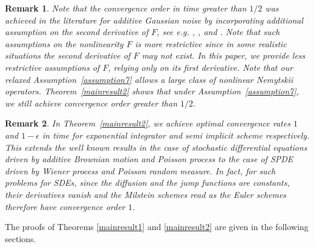\documentclass[review,12pt]{elsarticle}
\newtheorem{remark}{Remark}[section]
\newcommand{\thmref}[1]{{Theorem~\ref{#1}}}
\newcommand{\assref}[1]{{Assumption~\ref{#1}}}
\begin{document}
\begin{remark}
\label{remarkconditions}
Note that the convergence order in time greater than $1/2$ was achieved in the literature for additive Gaussian noise by incorporating additional assumption on the second derivative of $F$, see e.g. \cite[Assumption 2.2]{Xiaojie2}, \cite[Assumption 2.1]{Xiaojie3}, \cite[Assumption 2.2]{AntonioRev1} and \cite[Assumption 2.1]{AntonioRev2}. Note that such assumptions on the nonlinearity $F$ is more restrictive since in some realistic situations the second derivative of $F$ may not exist. In this paper, we provide less restrictive assumptions of $F$, relying only on  its first derivative. Note that our relaxed \assref{assumption7} allows a large class of nonlinear Nemytskii operators. \thmref{mainresult2} shows that under \assref{assumption7}, we still achieve convergence order greater than $1/2$.
\end{remark}

\begin{remark}
\label{remarkorder}
In  \thmref{mainresult2}, we achieve optimal convergence rates $1$ and $1-\epsilon$ in time  for exponential  integrator and semi implicit scheme respectively.
 This extends the well known results in the case of stochastic differential equations driven by additive Brownian motion and Poisson process to the case of SPDE driven by Wiener process and Poisson random measure. 
 In fact,  for such problems for SDEs, since the diffusion  and the jump functions are constants,  their derivatives vanish and the Milstein schemes read as the  Euler schemes  therefore have  convergence order $1$.
\end{remark}
The proofs of Theorems \ref{mainresult1} and \ref{mainresult2} are given in the following sections.
\end{document}
